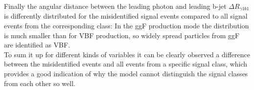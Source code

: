 Finally the angular distance between the leading photon and leading b-jet $\Delta R_{\gamma1 b1}$ is differently distributed for the misidentified signal events compared to all signal events from the corresponding class:
In the ggF production mode the distribution is much smaller than for VBF production, so widely spread particles from ggF are identified as VBF. \\

To sum it up for different kinds of variables it can be clearly observed a difference between the misidentified events and all events from a specific signal class, 
which provides a good indication of why the model cannot distinguish the signal classes from each other so well.